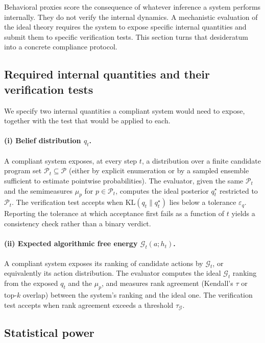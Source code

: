 \documentclass[11pt]{article}
\theoremstyle{remark}
\newcommand{\Pcal}{\mathcal{P}}
\newcommand{\Gcal}{\mathcal{G}}
\newcommand{\KL}{\mathrm{KL}}
\begin{document}
Behavioral proxies score the consequence of whatever inference a system performs internally. They do not verify the internal dynamics. A mechanistic evaluation of the ideal theory requires the system to expose specific internal quantities and submit them to specific verification tests. This section turns that desideratum into a concrete compliance protocol.

\subsection{Required internal quantities and their verification tests}

We specify two internal quantities a compliant system would need to expose, together with the test that would be applied to each.

\paragraph{(i) Belief distribution \(q_t\).} A compliant system exposes, at every step \(t\), a distribution over a finite candidate program set \(\mathcal{P}_t \subseteq \Pcal\) (either by explicit enumeration or by a sampled ensemble sufficient to estimate pointwise probabilities). The evaluator, given the same \(\mathcal{P}_t\) and the semimeasures \(\mu_p\) for \(p \in \mathcal{P}_t\), computes the ideal posterior \(q_t^\star\) restricted to \(\mathcal{P}_t\). The verification test accepts when \(\KL(q_t \| q_t^\star)\) lies below a tolerance \(\varepsilon_q\). Reporting the tolerance at which acceptance first fails as a function of \(t\) yields a consistency check rather than a binary verdict.

\paragraph{(ii) Expected algorithmic free energy \(\Gcal_t(a;h_t)\).} A compliant system exposes its ranking of candidate actions by \(\Gcal_t\), or equivalently its action distribution. The evaluator computes the ideal \(\Gcal_t\) ranking from the exposed \(q_t\) and the \(\mu_p\), and measures rank agreement (Kendall's \(\tau\) or top-\(k\) overlap) between the system's ranking and the ideal one. The verification test accepts when rank agreement exceeds a threshold \(\tau_\Gcal\).

\subsection{Statistical power}
\end{document}
